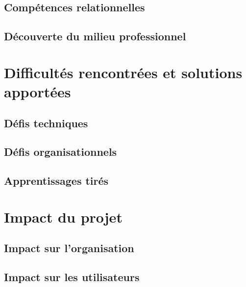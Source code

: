 
\subsection{Compétences relationnelles}


\subsection{Découverte du milieu professionnel}


\section{Difficultés rencontrées et solutions apportées}


\subsection{Défis techniques}


\subsection{Défis organisationnels}


\subsection{Apprentissages tirés}


\section{Impact du projet}


\subsection{Impact sur l'organisation}


\subsection{Impact sur les utilisateurs}

